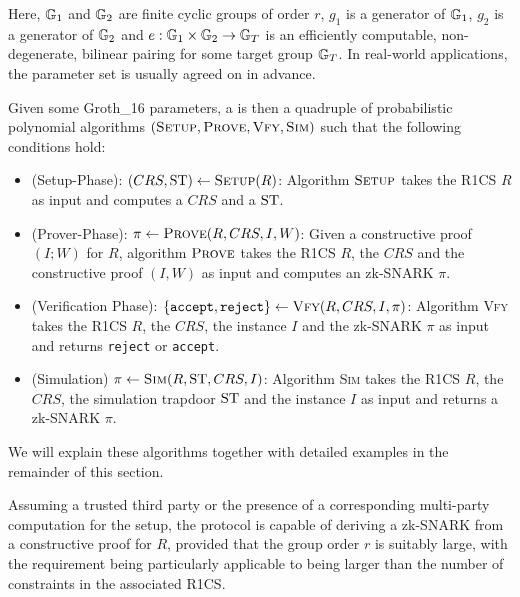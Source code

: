 Here, $\mathbb{G}_1$ and $\mathbb{G}_2$ are finite cyclic groups of order $r$, $g_1$ is a generator of $\mathbb{G}_1$, $g_2$ is a generator of $\mathbb{G}_2$ and $e: \mathbb{G}_1 \times \mathbb{G}_2 \to \mathbb{G}_T$ is an efficiently computable, non-degenerate, bilinear pairing for some target group $\mathbb{G}_T$. In real-world applications, the parameter set is usually agreed on in advance. 

Given some Groth\_16 parameters, a  is then a quadruple of probabilistic polynomial algorithms $(\textsc{Setup},\textsc{Prove},\textsc{Vfy},\textsc{Sim})$ such that the following conditions hold:
\begin{itemize}
\item (Setup-Phase): $(CRS,\mathrm{ST})\leftarrow \textsc{Setup}(R)$: Algorithm $\textsc{Setup}$ takes the R1CS $R$ as input and computes a  $CRS$ and a  $\mathrm{ST}$.
\item (Prover-Phase): $\pi\leftarrow \textsc{Prove}(R,CRS,I,W)$: Given a constructive proof $(I;W)$ for $R$, algorithm $\textsc{Prove}$ takes the R1CS $R$, the  $CRS$ and the constructive proof $(I,W)$ as input and computes an zk-SNARK $\pi$.
\item (Verification Phase): $\{\mathtt{accept},\mathtt{reject}\}\leftarrow \textsc{Vfy}(R,CRS,I,\pi)$:   Algorithm \textsc{Vfy} takes the R1CS $R$, the  $CRS$, the instance $I$ and the zk-SNARK $\pi$ as input and returns \texttt{reject} or \texttt{accept}.
\item (Simulation) $\pi\leftarrow \textsc{Sim}(R,\mathrm{ST},CRS, I)$: Algorithm \textsc{Sim} takes the R1CS $R$, the  $CRS$, the simulation trapdoor $\mathrm{ST}$ and the instance $I$ as input and returns a zk-SNARK $\pi$. 
\end{itemize}
We will explain these algorithms together with detailed examples in the remainder of this section.

Assuming a trusted third party or the presence of a corresponding multi-party computation for the setup, the protocol is capable of deriving a zk-SNARK from a constructive proof for $R$, provided that the group order $r$ is suitably large, with the requirement being particularly applicable to being larger than the number of constraints in the associated R1CS.

